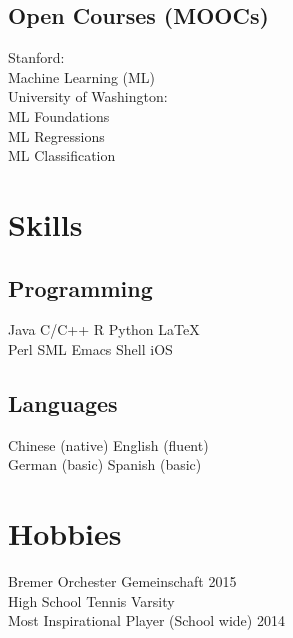 \documentclass[]{deedy-resume-openfont}
\begin{document}
\begin{minipage}[t]{0.33\textwidth}
\sectionsep

\subsection{Open Courses (MOOCs)}
{\large Stanford}: \\
Machine Learning (ML) \\

\sectionsep
{\large University of Washington}:  \\
ML Foundations  \\
ML Regressions  \\
ML Classification

\sectionsep


\section{Skills}
\subsection{Programming}
Java \textbullet{}   C/C++ \textbullet{} R \textbullet{} Python \textbullet \LaTeX \\
Perl \textbullet{} SML \textbullet{} Emacs \textbullet{} Shell \textbullet{} iOS \\

\sectionsep

\subsection{Languages}
Chinese (native) \textbullet{}  English (fluent) \\
German (basic) \textbullet{}   Spanish (basic)

\sectionsep

\section{Hobbies}
\textbullet{}  Bremer Orchester Gemeinschaft 2015 \\
\textbullet{} High School Tennis Varsity \\
\textbullet{} Most Inspirational Player (School wide) 2014 

%
%

\end{minipage} 
\end{document}
